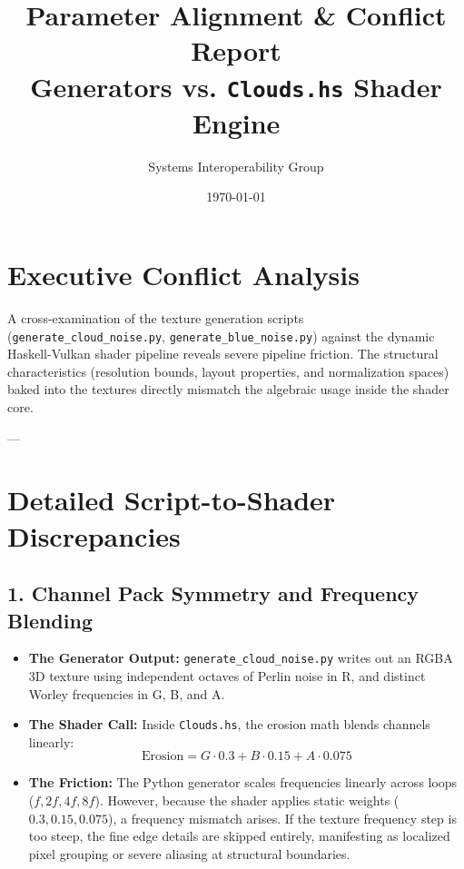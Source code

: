 \documentclass[11pt,a4paper]{article}
\title{Parameter Alignment \& Conflict Report \\ \large Generators vs. \texttt{Clouds.hs} Shader Engine}
\author{Systems Interoperability Group}
\date{\today}
\begin{document}
\maketitle

\section{Executive Conflict Analysis}
A cross-examination of the texture generation scripts (\texttt{generate\_cloud\_noise.py}, \texttt{generate\_blue\_noise.py}) against the dynamic Haskell-Vulkan shader pipeline reveals severe pipeline friction. The structural characteristics (resolution bounds, layout properties, and normalization spaces) baked into the textures directly mismatch the algebraic usage inside the shader core.

---

\section{Detailed Script-to-Shader Discrepancies}

\subsection{1. Channel Pack Symmetry and Frequency Blending}
\begin{itemize}
    \item \textbf{The Generator Output:} \texttt{generate\_cloud\_noise.py} writes out an RGBA 3D texture using independent octaves of Perlin noise in R, and distinct Worley frequencies in G, B, and A.
    \item \textbf{The Shader Call:} Inside \texttt{Clouds.hs}, the erosion math blends channels linearly:
    \begin{equation}
        \text{Erosion} = G \cdot 0.3 + B \cdot 0.15 + A \cdot 0.075
    \end{equation}
    \item \textbf{The Friction:} The Python generator scales frequencies linearly across loops ($f, 2f, 4f, 8f$). However, because the shader applies static weights ($0.3, 0.15, 0.075$), a frequency mismatch arises. If the texture frequency step is too steep, the fine edge details are skipped entirely, manifesting as localized pixel grouping or severe aliasing at structural boundaries.
\end{itemize}
\end{document}
